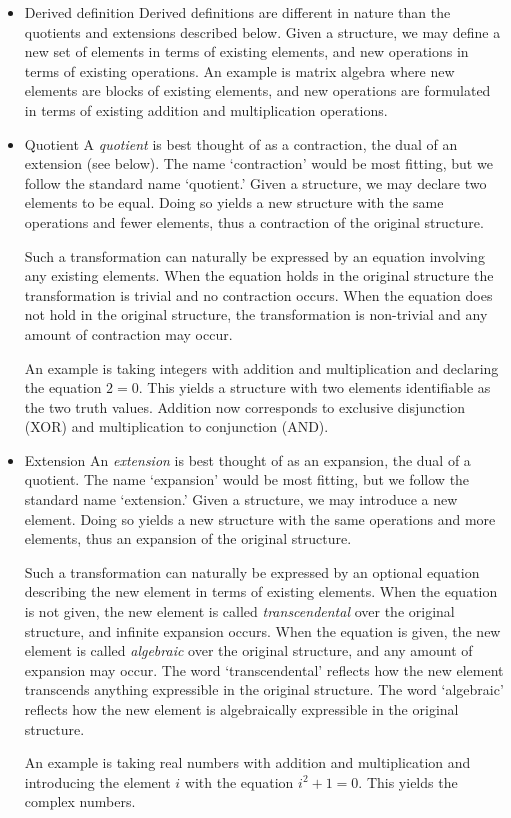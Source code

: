 \begin{itemize}

    \item{Derived definition}
    Derived definitions are different in nature than the quotients and extensions described below.
    Given a structure, we may define a new set of elements in terms of existing elements, and new operations in terms of existing operations.
    An example is matrix algebra where new elements are blocks of existing elements, and new operations are formulated in terms of existing addition and multiplication operations.

    \item{Quotient}
    A \emph{quotient} is best thought of as a contraction, the dual of an extension (see below).
    The name `contraction' would be most fitting, but we follow the standard name `quotient.'
    Given a structure, we may declare two elements to be equal.
    Doing so yields a new structure with the same operations and fewer elements, thus a contraction of the original structure.

    Such a transformation can naturally be expressed by an equation involving any existing elements.
    When the equation holds in the original structure the transformation is trivial and no contraction occurs.
    When the equation does not hold in the original structure, the transformation is non-trivial and any amount of contraction may occur.

    An example is taking integers with addition and multiplication and declaring the equation $2=0$.
    This yields a structure with two elements identifiable as the two truth values.
    Addition now corresponds to exclusive disjunction (XOR) and multiplication to conjunction (AND).

    \item{Extension}
    An \emph{extension} is best thought of as an expansion, the dual of a quotient.
    The name `expansion' would be most fitting, but we follow the standard name `extension.'
    Given a structure, we may introduce a new element.
    Doing so yields a new structure with the same operations and more elements, thus an expansion of the original structure.

    Such a transformation can naturally be expressed by an optional equation describing the new element in terms of existing elements.
    When the equation is not given, the new element is called \emph{transcendental} over the original structure, and infinite expansion occurs.
    When the equation is given, the new element is called \emph{algebraic} over the original structure, and any amount of expansion may occur.
    The word `transcendental' reflects how the new element transcends anything expressible in the original structure.
    The word `algebraic' reflects how the new element is algebraically expressible in the original structure.

    An example is taking real numbers with addition and multiplication and introducing the element $i$ with the equation $i^2+1=0$. 
    This yields the complex numbers. 

\end{itemize}

